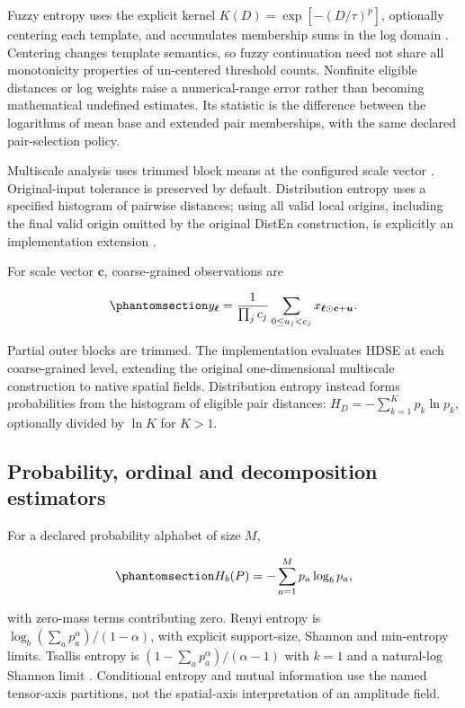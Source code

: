 \documentclass[
  english,
  11pt,
]{article}
\begin{document}
Fuzzy entropy uses the explicit kernel \(K(D)=\exp[-(D/\tau)^p]\),
optionally centering each template, and accumulates membership sums in
the log domain \citep{chen2007}. Centering changes template semantics,
so fuzzy continuation need not share all monotonicity properties of
un-centered threshold counts. Nonfinite eligible distances or log
weights raise a numerical-range error rather than becoming mathematical
undefined estimates. Its statistic is the difference between the
logarithms of mean base and extended pair memberships, with the same
declared pair-selection policy.

Multiscale analysis uses trimmed block means at the configured scale
vector \citep{costa2002}. Original-input tolerance is preserved by
default. Distribution entropy uses a specified histogram of pairwise
distances; using all valid local origins, including the final valid
origin omitted by the original DistEn construction, is explicitly an
implementation extension \citep{li2015distribution}.

For scale vector \(\boldsymbol c\), coarse-grained observations are

\begin{equation}\protect\phantomsection\label{eq:coarse-grain}{
y_{\boldsymbol\ell}=\frac{1}{\prod_jc_j}
\sum_{0\leq u_j<c_j}x_{\boldsymbol\ell\odot\boldsymbol c+\boldsymbol u}.
}\end{equation}

Partial outer blocks are trimmed. The implementation evaluates HDSE at
each coarse-grained level, extending the original one-dimensional
multiscale construction to native spatial fields. Distribution entropy
instead forms probabilities from the histogram of eligible pair
distances: \(H_D=-\sum_{k=1}^{K}p_k\ln p_k\), optionally divided by
\(\ln K\) for \(K>1\).

\subsection{Probability, ordinal and decomposition
estimators}\label{probability-ordinal-and-decomposition-estimators}

For a declared probability alphabet of size \(M\),

\begin{equation}\protect\phantomsection\label{eq:shannon}{
H_b(P)=-\sum_{a=1}^{M}p_a\log_b p_a,
}\end{equation}

with zero-mass terms contributing zero. Renyi entropy is
\(\log_b(\sum_a p_a^\alpha)/(1-\alpha)\), with explicit support-size,
Shannon and min-entropy limits. Tsallis entropy is
\((1-\sum_a p_a^\alpha)/(\alpha-1)\) with \(k=1\) and a natural-log
Shannon limit \citep{renyi1961, tsallis1988}. Conditional entropy and
mutual information use the named tensor-axis partitions, not the
spatial-axis interpretation of an amplitude field.
\end{document}
